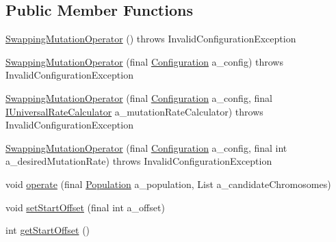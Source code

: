\subsection*{Public Member Functions}
\begin{DoxyCompactItemize}
\item 
\hyperlink{classorg_1_1jgap_1_1impl_1_1_swapping_mutation_operator_a99466fe42f99057ac58575f31c8ac0c9}{Swapping\-Mutation\-Operator} ()  throws Invalid\-Configuration\-Exception 
\item 
\hyperlink{classorg_1_1jgap_1_1impl_1_1_swapping_mutation_operator_a63832201f7929c857ac8c08a36e8774d}{Swapping\-Mutation\-Operator} (final \hyperlink{classorg_1_1jgap_1_1_configuration}{Configuration} a\-\_\-config)  throws Invalid\-Configuration\-Exception 
\item 
\hyperlink{classorg_1_1jgap_1_1impl_1_1_swapping_mutation_operator_a5125bd9c3714d95f5c1097bf011d3c23}{Swapping\-Mutation\-Operator} (final \hyperlink{classorg_1_1jgap_1_1_configuration}{Configuration} a\-\_\-config, final \hyperlink{interfaceorg_1_1jgap_1_1_i_universal_rate_calculator}{I\-Universal\-Rate\-Calculator} a\-\_\-mutation\-Rate\-Calculator)  throws Invalid\-Configuration\-Exception 
\item 
\hyperlink{classorg_1_1jgap_1_1impl_1_1_swapping_mutation_operator_a615f713435327476dc65db3f0200157e}{Swapping\-Mutation\-Operator} (final \hyperlink{classorg_1_1jgap_1_1_configuration}{Configuration} a\-\_\-config, final int a\-\_\-desired\-Mutation\-Rate)  throws Invalid\-Configuration\-Exception 
\item 
void \hyperlink{classorg_1_1jgap_1_1impl_1_1_swapping_mutation_operator_a810eb9c5bd759b5e4a61f6a91963b7df}{operate} (final \hyperlink{classorg_1_1jgap_1_1_population}{Population} a\-\_\-population, List a\-\_\-candidate\-Chromosomes)
\item 
void \hyperlink{classorg_1_1jgap_1_1impl_1_1_swapping_mutation_operator_aceccb3775429c8efd2b45ad6e7f979d0}{set\-Start\-Offset} (final int a\-\_\-offset)
\item 
int \hyperlink{classorg_1_1jgap_1_1impl_1_1_swapping_mutation_operator_ad580708adf59332d0519ec5cd71d1626}{get\-Start\-Offset} ()
\end{DoxyCompactItemize}
